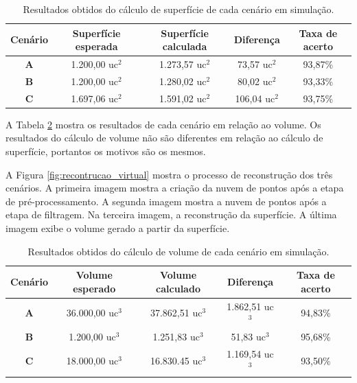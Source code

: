 \begin{table}[H]
    \centering
    \caption{Resultados obtidos do cálculo de superfície de cada cenário em simulação.}
    \begin{tabular}{@{}ccccc@{}}
        \toprule
        \textbf{Cenário} & \textbf{Superfície esperada} & \textbf{Superfície calculada} & \textbf{Diferença} & \textbf{Taxa de acerto} \\ \midrule
        \textbf{A} & 1.200,00 uc$^2$ & 1.273,57 uc$^2$ & 73,57 uc$^2$ & 93,87\% \\
        \textbf{B} & 1.200,00 uc$^2$ & 1.280,02 uc$^2$ & 80,02 uc$^2$ & 93,33\% \\
        \textbf{C} & 1.697,06 uc$^2$ & 1.591,02 uc$^2$ & 106,04 uc$^2$ & 93,75\% \\ \bottomrule
    \end{tabular}
    \label{tab:tabela_result_cenarios_sup}
\end{table}

A Tabela \ref{tab:tabela_result_cenarios_vol} mostra os resultados de cada cenário em relação ao volume.
Os resultados do cálculo de volume não são diferentes em relação ao cálculo de superfície, portantos os motivos são os mesmos.

A Figura \ref{fig:recontrucao_virtual} mostra o processo de reconstrução dos três cenários. 
A primeira imagem mostra a criação da nuvem de pontos após a etapa de pré-processamento.
A segunda imagem mostra a nuvem de pontos após a etapa de filtragem.
Na terceira imagem, a reconstrução da superfície.
A última imagem exibe o volume gerado a partir da superfície.

\begin{table}[H]
    \centering
    \caption{Resultados obtidos do cálculo de volume de cada cenário em simulação.}
    \begin{tabular}{@{}ccccc@{}}
        \toprule
        \textbf{Cenário} & \textbf{Volume esperado} & \textbf{Volume calculado} & \textbf{Diferença} & \textbf{Taxa de acerto} \\ \midrule
        \textbf{A} & 36.000,00 uc$^3$ & 37.862,51 uc$^3$ & 1.862,51 uc$^3$ & 94,83\% \\
        \textbf{B} & 1.200,00 uc$^3$ & 1.251,83 uc$^3$ & 51,83 uc$^3$ & 95,68\% \\
        \textbf{C} & 18.000,00 uc$^3$ & 16.830.45 uc$^3$ & 1.169,54 uc$^3$ & 93,50\% \\ \bottomrule
    \end{tabular}
    \label{tab:tabela_result_cenarios_vol}
\end{table}

